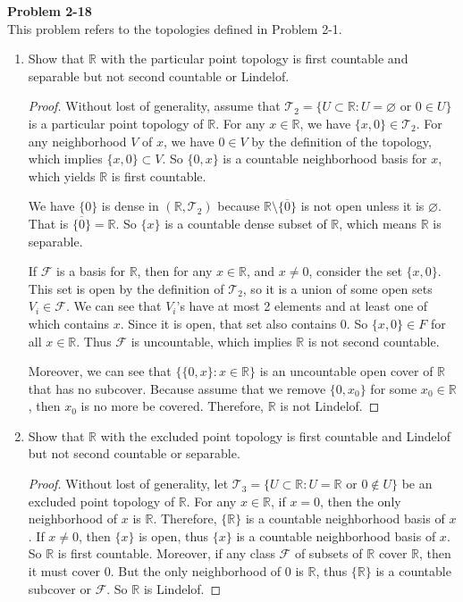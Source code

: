 \documentclass[12pt, a4paper]{article}
\theoremstyle{plain}
\newcommand{\R}{\mathbb{R}}
\newcommand{\F}{\mathcal{F}}
\newcommand{\T}{\mathcal{T}}
\newenvironment{problem}[2][Problem]
    { \begin{mdframed}[backgroundcolor=gray!20] \textbf{#1 #2} \\}
    {  \end{mdframed}}
\begin{document}
\pagebreak

\begin{problem}{2-18}
This problem refers to the topologies defined in Problem 2-1.
\begin{enumerate}[label=(\alph*)]
\item Show that $\R$ with the particular point topology is first countable and separable but not second countable or Lindelof.
	\begin{proof}
	Without lost of generality, assume that $\T_2=\{U\subset \R:U=\varnothing \text{ or } 0\in U\}$ is a particular point topology of $\R$. For any $x\in \R$, we have $\{x,0\}\in\T_2$. For any neighborhood $V$ of $x$, we have $0\in V$ by the definition of the topology, which implies $\{x,0\}\subset V$. So $\{0,x\}$ is a countable neighborhood basis for $x$, which yields $\R$ is first countable.
	
	We have $\{0\}$ is dense in $(\R,\T_2)$ because $\R\setminus\overline{\{0\}}$ is not open unless it is $\varnothing$. That is $\overline{\{0\}}=\R$. So $\{x\}$ is a countable dense subset of $\R$, which means $\R$ is separable. 
	
	If $\F$ is a basis for $\R$, then for any $x\in \R$, and $x\neq 0$, consider the set $\{x,0\}$. This set is open by the definition of $\T_2$, so it is a union of some open sets $V_i\in\F$. We can see that $V_i$'s have at most 2 elements and at least one of which contains $x$. Since it is open, that set also contains $0$. So $\{x,0\}\in F$ for all $x\in \R$. Thus $\F$ is uncountable, which implies $\R$ is not second countable.
	
	Moreover, we can see that $\{\{0,x\}:x\in \R\}$ is an uncountable open cover of $\R$ that has no subcover. Because assume that we remove $\{0,x_0\}$ for some $x_0\in\R$, then $x_0$ is no more be covered. Therefore, $\R$ is not Lindelof.
	\end{proof}

\item Show that $\R$ with the excluded point topology is first countable and Lindelof but not second countable or separable.
	\begin{proof}
	Without lost of generality, let $\T_3=\{U\subset\R:U=\R\text{ or } 0\notin U\}$ be an excluded point topology of $\R$. For any $x\in \R$, if $x= 0$, then the only neighborhood of $x$ is $\R$. Therefore, $\{\R\}$ is a countable neighborhood basis of $x$. If $x\neq 0$, then $\{x\}$ is open, thus $\{x\}$ is a countable neighborhood basis of $x$. So $\R$ is first countable. Moreover, if any class $\F$ of subsets of $\R$ cover $\R$, then it must cover $0$. But the only neighborhood of $0$ is $\R$, thus $\{\R\}$ is a countable subcover or $\F$. So $\R$ is Lindelof.
	

\end{proof}
\end{enumerate}
\end{problem}
\end{document}
